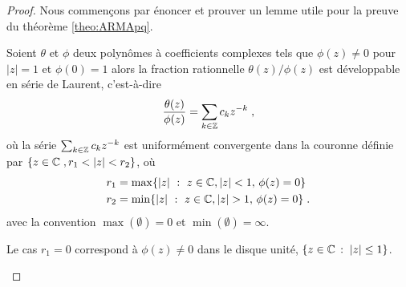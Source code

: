 \begin{proof}
Nous commen\c{c}ons par \'enoncer et prouver un lemme utile pour la preuve
du th\'eor\`eme \ref{theo:ARMApq}.
\begin{lemma}\label{lem:dev_laurent}
  Soient $\theta$ et $\phi$ deux polyn\^omes \`a coefficients complexes tels que
  $\phi(z) \neq 0$ pour $|z|=1$ et $\phi(0)=1$ alors la fraction rationnelle
  $\theta(z)/\phi(z)$ est d\'eveloppable en s\'erie de Laurent, c'est-\`a-dire
$$
\frac{\theta(z)}{\phi(z)}=\sum_{k\in\mathbb{Z}} c_k z^{-k}\;,
$$
o\`u la s\'erie $\sum_{k \in \mathbb{Z}} c_k z^{-k}$ est uniform\'ement convergente dans la
couronne d\'efinie par
$\left\{ z\in\cset \eqsp, r_1<|z|<r_2 \right\}$, o\`u
\begin{align*}
r_1&=\max\{ |z|~:~ z \in \mathbb{C}, | z | < 1, \,\phi(z) =0 \}\\
r_2&=\min\{ |z|~:~ z  \in \mathbb{C}, |z| > 1, \,\phi(z) = 0 \}\; .
\end{align*}
avec la convention $\max(\emptyset)=0$ et $\min(\emptyset)=\infty$.

Le cas $r_1=0$ correspond \`a $\phi(z)\neq0$ dans le disque unité, 
$\left\{z \in \mathbb{C}\,:\; |z|\leq1\right\}$. 


\end{lemma}
\end{proof}
